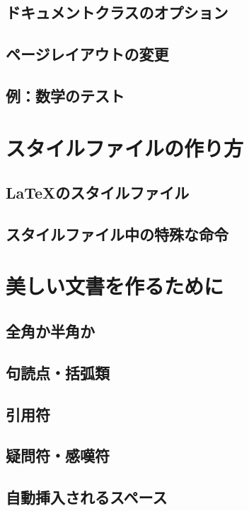 \documentclass{jsbook}
\begin{document}
\section{ドキュメントクラスのオプション}

\section{ページレイアウトの変更}

\section{例：数学のテスト}

\chapter{スタイルファイルの作り方}

\section{LaTeXのスタイルファイル}

\section{スタイルファイル中の特殊な命令}

\chapter{美しい文書を作るために}

\section{全角か半角か}

\section{句読点・括弧類}

\section{引用符}

\section{疑問符・感嘆符}

\section{自動挿入されるスペース}
\end{document}
